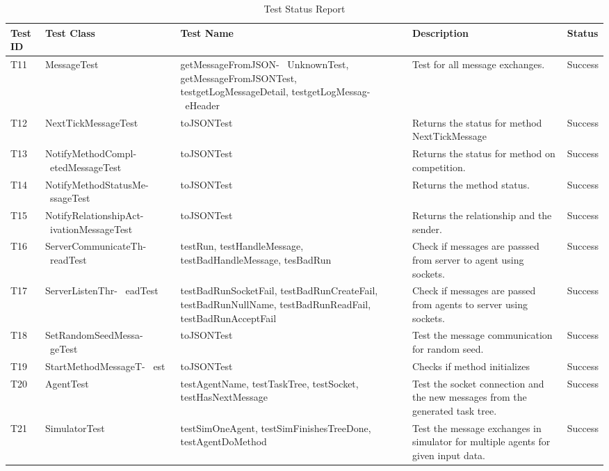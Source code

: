 \begin{enumerate}
\begin{itemize}
\begin{table}[H] 
\caption{Test Status Report} %
\begin{tabular}{| l | p{4cm} | p{4cm} | p{4cm} | l |} %
\hline\hline %
 Test ID & Test Class &Test Name &  Description & Status \\ [0.5ex] %
\hline %
T11 & MessageTest & getMessageFromJSON- \ UnknownTest, getMessageFromJSONTest, testgetLogMessageDetail, testgetLogMessag- \ eHeader & Test for all message exchanges. &  Success \\
T12 & NextTickMessageTest & toJSONTest & Returns the status for method NextTickMessage & Success \\
T13 & NotifyMethodCompl- \ etedMessageTest & toJSONTest & Returns the status for method on competition. &  Success \\
T14 & NotifyMethodStatusMe- \ ssageTest & toJSONTest & Returns the method status. &  Success \\
T15 & NotifyRelationshipAct- \ ivationMessageTest & toJSONTest & Returns the relationship and the sender. &  Success \\
T16 & ServerCommunicateTh- \ readTest & testRun, testHandleMessage, testBadHandleMessage, tesBadRun & Check if messages are passsed from server to agent using sockets. &  Success \\
T17 & ServerListenThr- \ eadTest & testBadRunSocketFail, testBadRunCreateFail, testBadRunNullName, testBadRunReadFail, testBadRunAcceptFail & Check if messages are passed from agents to server using sockets. &  Success \\
T18 & SetRandomSeedMessa- \ geTest & toJSONTest & Test the message communication for random seed. &  Success \\
T19 & StartMethodMessageT- \ est &  toJSONTest & Checks if method initializes &  Success \\ 
T20 & AgentTest & testAgentName, testTaskTree, testSocket, testHasNextMessage & Test the socket connection and the new messages from the generated task tree. &  Success \\
T21 & SimulatorTest &  testSimOneAgent, testSimFinishesTreeDone, testAgentDoMethod & Test the message exchanges in simulator for multiple agents for given input data. &  Success \\
\hline %
\end{tabular} 
\label{table:nonlin} %
\end{table}


\end{itemize}
\end{enumerate}
